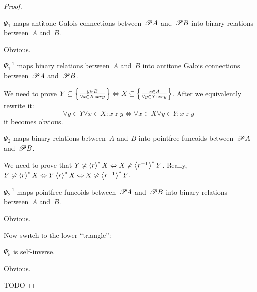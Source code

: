 \begin{proof}
\begin{claim}
$\Psi_1$ maps antitone Galois connections between~$\mathscr{P} A$ and~$\mathscr{P} B$ into binary relations between~$A$ and~$B$.
\end{claim}
\begin{claimproof}
Obvious.
\end{claimproof}

\begin{claim}
$\Psi_1^{-1}$ maps binary relations between~$A$ and~$B$ into antitone Galois connections between~$\mathscr{P} A$ and~$\mathscr{P} B$.
\end{claim}
\begin{claimproof}
We need to prove $Y\subseteq\left\{ \frac{y\in B}{\forall x\in X:x\mathrel{r}y}\right\}\Leftrightarrow X\subseteq\left\{ \frac{x\in A}{\forall y\in Y:x\mathrel{r}y}\right\}$.
After we equivalently rewrite it:
\[\forall y\in Y \forall x\in X:x\mathrel{r}y\Leftrightarrow\forall x\in X\forall y\in Y:x\mathrel{r}y\]
it becomes obvious.
\end{claimproof}

\begin{claim}
$\Psi_2$ maps binary relations between~$A$ and~$B$ into pointfree funcoids between~$\mathscr{P} A$ and~$\mathscr{P} B$.
\end{claim}
\begin{claimproof}
We need to prove that $Y\not\asymp\left\langle r\right\rangle ^{\ast}X\Leftrightarrow X\not\asymp\left\langle r^{-1}\right\rangle ^{\ast}Y$. Really,
$Y\not\asymp\left\langle r\right\rangle ^{\ast}X\Leftrightarrow Y\left\langle r\right\rangle ^{\ast}X\Leftrightarrow X\not\asymp\left\langle r^{-1}\right\rangle ^{\ast}Y$.
\end{claimproof}

\begin{claim}
$\Psi_2^{-1}$ maps pointfree funcoids between~$\mathscr{P} A$ and~$\mathscr{P} B$ into binary relations between~$A$ and~$B$.
\end{claim}
\begin{claimproof}
Obvious.
\end{claimproof}

Now switch to the lower ``triangle'':

\begin{claim}
$\Psi_5$ is self-inverse.
\end{claim}
\begin{claimproof}
Obvious.
\end{claimproof}


TODO
\end{proof}